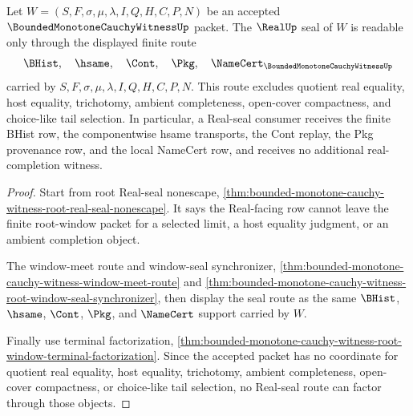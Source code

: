 \begin{theorem}
\label{thm:bounded-monotone-cauchy-witness-real-seal-route}
Let $W=(S,F,\sigma,\mu,\lambda,I,Q,H,C,P,N)$ be an accepted $\BoundedMonotoneCauchyWitnessUp$ packet. The $\RealUp$ seal of $W$ is readable only through the displayed finite route
$$
\BHist,\quad \hsame,\quad \Cont,\quad \Pkg,\quad \NameCert_{\BoundedMonotoneCauchyWitnessUp}
$$
carried by $S,F,\sigma,\mu,\lambda,I,Q,H,C,P,N$. This route excludes quotient real equality, host equality, trichotomy, ambient completeness, open-cover compactness, and choice-like tail selection. In particular, a Real-seal consumer receives the finite BHist row, the componentwise hsame transports, the Cont replay, the Pkg provenance row, and the local NameCert row, and receives no additional real-completion witness.
\end{theorem}
\begin{proof}
Start from root Real-seal nonescape, \autoref{thm:bounded-monotone-cauchy-witness-root-real-seal-nonescape}. It says the Real-facing row cannot leave the finite root-window packet for a selected limit, a host equality judgment, or an ambient completion object.

The window-meet route and window-seal synchronizer, \autoref{thm:bounded-monotone-cauchy-witness-window-meet-route} and \autoref{thm:bounded-monotone-cauchy-witness-root-window-seal-synchronizer}, then display the seal route as the same $\BHist$, $\hsame$, $\Cont$, $\Pkg$, and $\NameCert$ support carried by $W$.

Finally use terminal factorization, \autoref{thm:bounded-monotone-cauchy-witness-root-window-terminal-factorization}. Since the accepted packet has no coordinate for quotient real equality, host equality, trichotomy, ambient completeness, open-cover compactness, or choice-like tail selection, no Real-seal route can factor through those objects.
\end{proof}

